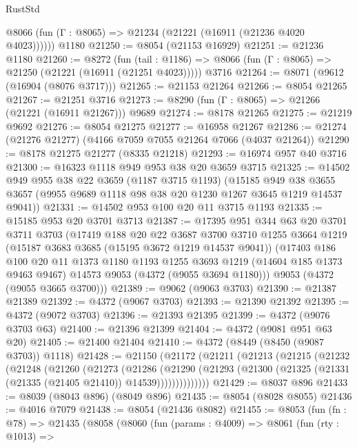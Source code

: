 \begin{lexlean}{RustStd}
\begin{coremodule}
      @8066 (fun (Γ : @8065) => @21234 (@21221 (@16911 (@21236 @4020 @4023))))))
    @1180
@21250 := @8054 (@21153 @16929)
@21251 := @21236 @1180
@21260 := @8272
    (fun (tail : @1186) => @8066 (fun (Γ : @8065) => @21250 (@21221 (@16911 (@21251 @4023)))))
    @3716
@21264 := @8071 (@9612 (@16904 (@8076 @3717)))
@21265 := @21153 @21264
@21266 := @8054 @21265
@21267 := @21251 @3716
@21273 := @8290 (fun (Γ : @8065) => @21266 (@21221 (@16911 @21267))) @9689
@21274 := @8178 @21265
@21275 := @21219 @9692
@21276 := @8054 @21275
@21277 := @16958 @21267
@21286 := @21274 (@21276 @21277) (@4166 @7059 @7055 @21264 @7066 (@4037 @21264))
@21290 := @8178 @21275 @21277 (@8335 @21218)
@21293 := @16974 @957 @40 @3716
@21300 := @16323 @1118 @949 @953 @38 @20 @3659 @3715
@21325 := @14502
    @949
    @955
    @38
    @22
    @3659
    (@1187 @3715 @1193)
    (@15185
      @949
      @38
      @3655
      @3657
      (@9955 @9689 @1118 @98 @38 @20 @1230 @1267 @3645 @1219 @14537 @9041))
@21331 := @14502 @953 @100 @20 @11 @3715 @1193
@21335 := @15185 @953 @20 @3701 @3713
@21387 := @17395
    @951
    @344
    @63
    @20
    @3701
    @3711
    @3703
    (@17419
      @188
      @20
      @22
      @3687
      @3700
      @3710
      @1255
      @3664
      @1219
      (@15187 @3683 @3685 (@15195 @3672 @1219 @14537 @9041))
      (@17403
        @186
        @100
        @20
        @11
        @1373
        @1180
        @1193
        @1255
        @3693
        @1219
        (@14604 @185 @1373 @9463 @9467)
        @14573
        @9053
        (@4372 (@9055 @3694 @1180)))
      @9053
      (@4372 (@9055 @3665 @3700)))
@21389 := @9062 (@9063 @3703)
@21390 := @21387 @21389
@21392 := @4372 (@9067 @3703)
@21393 := @21390 @21392
@21395 := @4372 (@9072 @3703)
@21396 := @21393 @21395
@21399 := @4372 (@9076 @3703 @63)
@21400 := @21396 @21399
@21404 := @4372 (@9081 @951 @63 @20)
@21405 := @21400 @21404
@21410 := @4372 (@8449 (@8450 (@9087 @3703)) @1118)
@21428 := @21150
    (@21172
      (@21211
        (@21213
          (@21215
            (@21232
              (@21248
                (@21260
                  (@21273
                    (@21286
                      (@21290
                        (@21293
                          (@21300 (@21325 (@21331 (@21335 (@21405 @21410)) @14539))))))))))))))
@21429 := @8037 @896
@21433 := @8039 (@8043 @896) (@8049 @896)
@21435 := @8054 (@8028 @8055)
@21436 := @4016 @7079
@21438 := @8054 (@21436 @8082)
@21455 := @8053
    (fun (fn : @78) =>
    @21435
      (@8058
        (@8060
          (fun (params : @4009) =>
          @8061
            (fun (rty : @1013) =>

\end{coremodule}
\end{lexlean}

